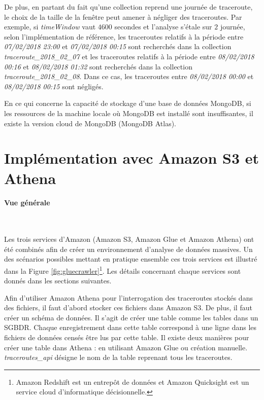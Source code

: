 De plus, en partant du fait qu'une collection reprend une journée de traceroute, le choix de la taille de la fenêtre peut amener à négliger des traceroutes. Par exemple, si \textit{timeWindow} vaut   $ 4600 $ secondes et l'analyse s'étale sur $2$ journée, selon l'implémentation de référence, les traceroutes relatifs à la période entre  \textit{07/02/2018 23:00} et \textit{07/02/2018 00:15}   sont recherchés dans la collection  \textit{traceroute\_2018\_02\_07} et les traceroutes 
relatifs à la période entre \textit{08/02/2018 00:16} et \textit{08/02/2018 01:32}  sont recherchés dans la collection \textit{traceroute\_2018\_02\_08}. Dans ce cas, les traceroutes entre \textit{08/02/2018 00:00} et \textit{08/02/2018 00:15} sont négligés.

En ce qui concerne la capacité de  stockage d'une base de données MongoDB,  si les ressources de la machine locale où MongoDB est installé sont insuffisantes, il existe la version cloud de MongoDB (MongoDB Atlas). 



\section{Implémentation avec Amazon S3 et Athena} \label{implementation-athena}


\paragraph{Vue générale}~

Les trois services d'Amazon (Amazon S3, Amazon Glue  et Amazon Athena) ont été combinés  afin de créer un environnement d'analyse de données massives. 
Un des scénarios possibles mettant en pratique ensemble ces trois services est illustré dans la Figure
\ref{fig:gluecrawler}\footnote{Amazon Redshift  est un entrepôt de données et  Amazon Quicksight  est un service cloud d'informatique décisionnelle.}. Les  détails concernant chaque services sont donnés dans les sections suivantes.

Afin d'utiliser Amazon Athena pour l'interrogation des traceroutes stockés dans des fichiers, il faut d'abord  stocker ces fichiers dans Amazon S3. De plus, il faut créer un  schéma de données. Il s'agit de créer une table comme les tables dans un SGBDR. Chaque enregistrement dans cette table correspond à une ligne dans les fichiers de données censés être lus par cette table. Il existe deux manières pour créer une table dans Athena : en utilisant Amazon Glue ou création manuelle. \textit{traceroutes\_api} désigne le nom de la table reprenant tous les traceroutes.

